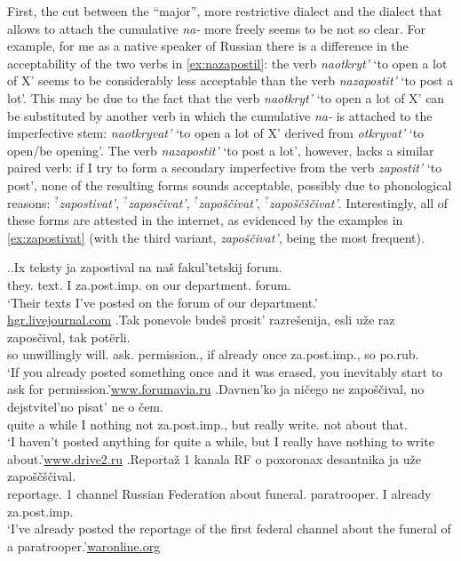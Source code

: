 First, the cut between the ``major'', more restrictive dialect and the dialect that allows to attach the cumulative \textit{na-} more freely seems to be not so clear. For example, for me as a native speaker of Russian there is a difference in the acceptability of the two verbs in \ref{ex:nazapostil}: the verb \textit{naotkryt'} `to open a lot of X' seems to be considerably less acceptable than the verb \textit{nazapostit'} `to post a lot'. This may be due to the fact that the verb \textit{naotkryt'} `to open a lot of X' can be substituted by another verb in which the cumulative \textit{na-} is attached to the imperfective stem: \textit{naotkryvat'}\textsuperscript{\PF} `to open a lot of X' derived from \textit{otkryvat'}\textsuperscript{\IPF} `to open/be opening'. The verb \textit{nazapostit'} `to post a lot', however, lacks a similar paired verb: if I try to form a secondary imperfective from the verb \textit{zapostit'} `to post', none of the resulting forms sounds acceptable, possibly due to phonological reasons: $^?$\textit{zapostivat'}, $^?$\textit{zapos\v{c}ivat'}, $^?$\textit{zapo\v{s}\v{c}ivat'}, $^?$\textit{zapo\v{s}\v{c}\v{s}\v{c}ivat'}. Interestingly, all of these forms are attested in the internet, as evidenced by the examples in \ref{ex:zapostivat} (with the third variant, \textit{zapo\v{s}\v{c}ivat'}, being the most frequent).

\ex.\label{ex:zapostivat}\ag.Ix teksty ja zapostival na na\v{s} fakul'tetskij forum.\\
they. text. I za.post.imp. on our department. forum.\\
\trans `Their texts I've posted on the forum of our department.'\\\hbox{}\hfill\hbox{\url{hgr.livejournal.com}}
\bg.Tak ponevole bude\v{s} prosit' razre\v{s}enija, esli u\v{z}e raz zapos\v{c}ival, tak pot\"{e}rli.\\
so unwillingly will. ask. permission., if already once za.post.imp., so po.rub.\\
\trans `If you already posted something once and it was erased, you inevitably start to ask for permission.'\hbox{}\hfill\hbox{\url{www.forumavia.ru}}
\bg.Davnen'ko ja ni\v{c}ego ne zapo\v{s}\v{c}ival, no dejstvitel'no pisat' ne o \v{c}em.\\
{quite a while} I nothing not za.post.imp., but really write. not about that.\\
\trans `I haven't posted anything for quite a while, but I really have nothing to write about.'\hbox{}\hfill\hbox{\url{www.drive2.ru}}
\bg.Reporta\v{z} 1 kanala RF o poxoronax desantnika ja u\v{z}e zapo\v{s}\v{c}\v{s}\v{c}ival.\\
reportage. 1 channel {Russian Federation} about funeral. paratrooper. I already za.post.imp.\\
\trans `I've already posted the reportage of the first federal channel about the funeral of a paratrooper.'\hbox{}\hfill\hbox{\url{waronline.org}}

